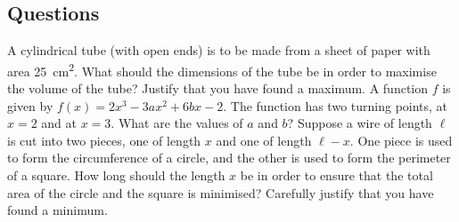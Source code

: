 \subsection*{Questions}
\begin{questions}
  \question A cylindrical tube (with open ends) is to be made from a sheet of paper with area \SI{25}{\centi\metre\squared}. What should the dimensions
            of the tube be in order to maximise the volume of the tube? Justify that you have found a maximum.
  \question A function $ f $ is given by $ f(x) = 2x^3 - 3ax^2 + 6bx - 2 $. The function has two turning points, at $ x = 2 $
            and at $ x = 3 $. What are the values of $ a $ and $ b $?
  \question Suppose a wire of length $ \ell $ is cut into two pieces, one of length $ x $ and one of length $ \ell - x $. One
            piece is used to form the circumference of a circle, and the other is used to form the perimeter of a square. How
            long should the length $ x $ be in order to ensure that the total area of the circle and the square is minimised?
            Carefully justify that you have found a minimum.
\end{questions}


